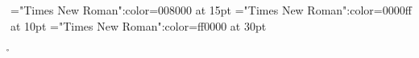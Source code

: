 \font\tctbta="Times New Roman":color=008000 at 15pt
\font\tbta="Times New Roman":color=0000ff at 10pt
\font\ta="Times New Roman":color=ff0000 at 30pt
 \r\n
{}






\bye
